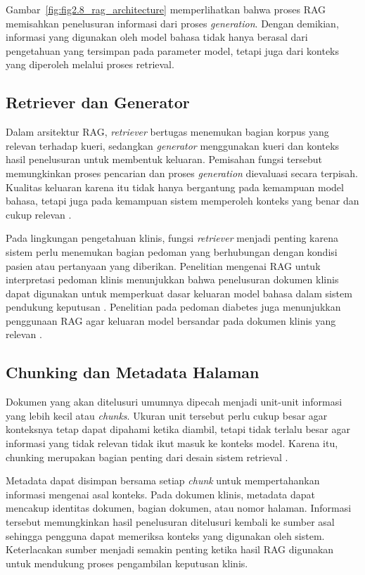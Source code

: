 Gambar~\ref{fig:fig2.8_rag_architecture} memperlihatkan bahwa proses RAG memisahkan penelusuran informasi dari proses \textit{generation}. Dengan demikian, informasi yang 
digunakan oleh model bahasa tidak hanya berasal dari pengetahuan yang tersimpan pada parameter model, tetapi juga dari konteks yang diperoleh melalui proses retrieval.

\subsection{Retriever dan Generator}
\label{subsec:bab2-retriever-generator}

Dalam arsitektur RAG, \textit{retriever} bertugas menemukan bagian korpus yang relevan terhadap kueri, sedangkan \textit{generator} menggunakan kueri dan konteks hasil
penelusuran untuk membentuk keluaran. Pemisahan fungsi tersebut memungkinkan proses pencarian dan proses \textit{generation} dievaluasi secara terpisah. Kualitas keluaran karena itu
tidak hanya bergantung pada kemampuan model bahasa, tetapi juga pada kemampuan sistem memperoleh konteks yang benar dan cukup relevan \parencite{lewis2020,gao2023}.

Pada lingkungan pengetahuan klinis, fungsi \textit{retriever} menjadi penting karena sistem perlu menemukan bagian pedoman yang berhubungan dengan kondisi pasien atau
pertanyaan yang diberikan. Penelitian mengenai RAG untuk interpretasi pedoman klinis menunjukkan bahwa penelusuran dokumen klinis dapat digunakan untuk memperkuat dasar
keluaran model bahasa dalam sistem pendukung keputusan \parencite{kresevic2024}. Penelitian pada pedoman diabetes juga menunjukkan penggunaan RAG agar keluaran model
bersandar pada dokumen klinis yang relevan \parencite{lee2024,wang2024}.

\subsection{Chunking dan Metadata Halaman}
\label{subsec:bab2-chunking-metadata}

Dokumen yang akan ditelusuri umumnya dipecah menjadi unit-unit informasi yang lebih kecil atau \textit{chunks}. Ukuran unit tersebut perlu cukup besar agar konteksnya tetap dapat
dipahami ketika diambil, tetapi tidak terlalu besar agar informasi yang tidak relevan tidak ikut masuk ke konteks model. Karena itu, chunking merupakan
bagian penting dari desain sistem retrieval \parencite{gao2023,xiong2024}.

Metadata dapat disimpan bersama setiap \textit{chunk} untuk mempertahankan informasi mengenai asal konteks. Pada dokumen klinis, metadata dapat mencakup identitas dokumen,
bagian dokumen, atau nomor halaman. Informasi tersebut memungkinkan hasil penelusuran ditelusuri kembali ke sumber asal sehingga pengguna dapat memeriksa konteks yang
digunakan oleh sistem. Keterlacakan sumber menjadi semakin penting ketika hasil RAG digunakan untuk mendukung proses pengambilan keputusan klinis.

